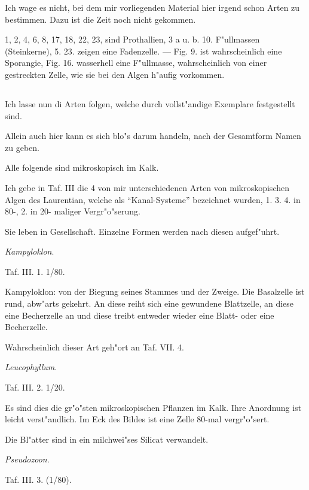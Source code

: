 \documentclass[a4paper, 11pt, oneside, german]{article}
\begin{document}
Ich wage es nicht, bei dem mir vorliegenden Material hier irgend schon Arten zu bestimmen. Dazu ist die Zeit noch nicht gekommen.

1, 2, 4, 6, 8, 17, 18, 22, 23, sind Prothallien, 3 a u. b. 10. F"ullmassen (Steinkerne), 5. 23. zeigen eine Fadenzelle. --- Fig. 9. ist wahrscheinlich eine Sporangie, Fig. 16. wasserhell eine F"ullmasse, wahrscheinlich von einer gestreckten Zelle, wie sie bei den Algen h"aufig vorkommen.
\clearpage
\subsection{}
\paragraph{}
Ich lasse nun di Arten folgen, welche durch vollst"andige Exemplare festgestellt sind.

Allein auch hier kann es sich blo"s darum handeln, nach der Gesamtform Namen zu geben.

Alle folgende sind mikroskopisch im Kalk.

Ich gebe in Taf. III die 4 von mir unterschiedenen Arten von mikroskopischen Algen des Laurentian, welche als "`Kanal-Systeme"' bezeichnet wurden, 1. 3. 4. in 80-, 2. in 20- maliger Vergr"o"serung.

Sie leben in Gesellschaft. Einzelne Formen werden nach diesen aufgef"uhrt.

\centerline{\emph{Kampyloklon}.}

Taf. III. 1. 1/80.

Kampyloklon: von der Biegung seines Stammes und der Zweige. Die Basalzelle ist rund, abw"arts gekehrt. An diese reiht sich eine gewundene Blattzelle, an diese eine Becherzelle an und diese treibt entweder wieder eine Blatt- oder eine Becherzelle.

Wahrscheinlich dieser Art geh"ort an Taf. VII. 4.

\centerline{\emph{Leucophyllum}.}

Taf. III. 2. 1/20.

Es sind dies die gr"o"sten mikroskopischen Pflanzen im Kalk. Ihre Anordnung ist leicht verst"andlich. Im Eck des Bildes ist eine Zelle 80-mal vergr"o"sert.

Die Bl"atter sind in ein milchwei"ses Silicat verwandelt.

\centerline{\emph{Pseudozoon}.}

Taf. III. 3. (1/80).
\end{document}
